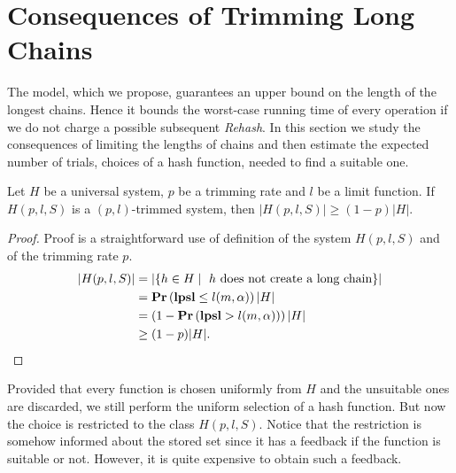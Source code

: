 \section{Consequences of Trimming Long Chains}
The model, which we propose, guarantees an upper bound on the length of the longest chains. Hence it bounds the worst-case running time of every operation if we do not charge a possible subsequent \emph{Rehash}. In this section we study the consequences of limiting the lengths of chains and then estimate the expected number of trials, choices of a hash function, needed to find a suitable one. 

\begin{lemma}
\label{lemma-size-of-trimmed-system}
Let $H$ be a universal system, $p$ be a trimming rate and $l$ be a limit function. If $H(p, l, S)$ is a $(p, l)$-trimmed system, then $|H(p, l, S)| \geq (1 - p)|H|$.
\end{lemma}
\begin{proof}
Proof is a straightforward use of definition of the system $H(p, l, S)$ and of the trimming rate $p$.
\[
\begin{split}
|H(p, l, S)| 
	& = |\lbrace h \in H \mid \text{ $h$ does not create a long chain} \rbrace| \\
	& =\mathbf{Pr}\left(\mathbf{lpsl} \leq l(m, \alpha)\right) |H| \\
	& = \left(1 - \mathbf{Pr}\left(\mathbf{lpsl} > l(m, \alpha)\right)\right) |H| \\
	& \geq (1 - p)|H| \text{.}
\end{split}
\]
\end{proof}

Provided that every function is chosen uniformly from $H$ and the unsuitable ones are discarded, we still perform the uniform selection of a hash function. But now the choice is restricted to the class $H(p, l, S)$. Notice that the restriction is somehow informed about the stored set since it has a feedback if the function is suitable or not. However, it is quite expensive to obtain such a feedback.

